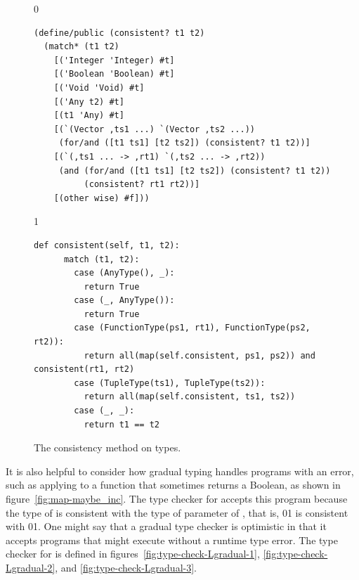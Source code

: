 \documentclass[7x10]{TimesAPriori_MIT}%
\newcommand{\gray}[1]{{\color{gray} #1}}
\def\racketEd{0}
\def\pythonEd{1}
\def\edition{0}
\newcommand{\racket}[1]{{\if\edition\racketEd{#1}\fi}}
\newcommand{\python}[1]{{\if\edition\pythonEd #1\fi}}
\numberwithin{theorem}{chapter}
\numberwithin{definition}{chapter}
\numberwithin{equation}{chapter}
\begin{document}
\begin{figure}[tbp]
  \begin{tcolorbox}[colback=white]
{\if\edition\racketEd    
\begin{lstlisting}
(define/public (consistent? t1 t2)
  (match* (t1 t2)
    [('Integer 'Integer) #t]
    [('Boolean 'Boolean) #t]
    [('Void 'Void) #t]
    [('Any t2) #t]
    [(t1 'Any) #t]
    [(`(Vector ,ts1 ...) `(Vector ,ts2 ...))
     (for/and ([t1 ts1] [t2 ts2]) (consistent? t1 t2))]
    [(`(,ts1 ... -> ,rt1) `(,ts2 ... -> ,rt2))
     (and (for/and ([t1 ts1] [t2 ts2]) (consistent? t1 t2))
          (consistent? rt1 rt2))]
    [(other wise) #f]))
\end{lstlisting}
\fi}
{\if\edition\pythonEd
\begin{lstlisting}[basicstyle=\ttfamily\footnotesize]
  def consistent(self, t1, t2):
      match (t1, t2):
        case (AnyType(), _):
          return True
        case (_, AnyType()):
          return True
        case (FunctionType(ps1, rt1), FunctionType(ps2, rt2)):
          return all(map(self.consistent, ps1, ps2)) and consistent(rt1, rt2)
        case (TupleType(ts1), TupleType(ts2)):
          return all(map(self.consistent, ts1, ts2))
        case (_, _):
          return t1 == t2
\end{lstlisting}  
  \fi}
  \end{tcolorbox}

  \caption{The consistency method on types.}
\label{fig:consistent}
\end{figure}

It is also helpful to consider how gradual typing handles programs with an
error, such as applying  to a function that sometimes
returns a Boolean, as shown in figure~\ref{fig:map-maybe_inc}.  The
type checker for \LangGrad{} accepts this program because the type of
 is consistent with the type of parameter  of
, that is,
\racket{}\python{}
is consistent with
\racket{}\python{}.
One might say that a gradual type checker is optimistic in that it
accepts programs that might execute without a runtime type error.
%
The type checker for \LangGrad{} is defined in
figures~\ref{fig:type-check-Lgradual-1}, \ref{fig:type-check-Lgradual-2},
and \ref{fig:type-check-Lgradual-3}.

\end{document}
